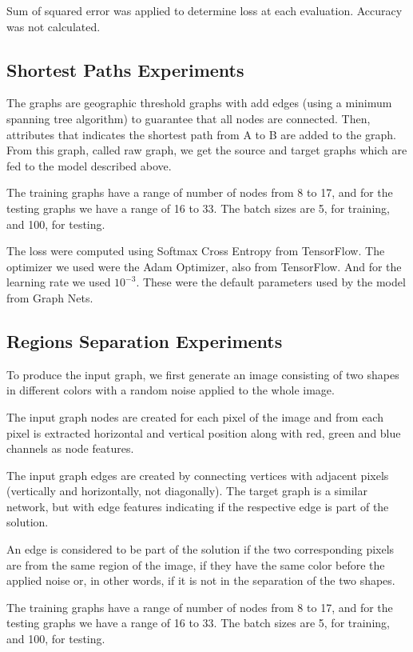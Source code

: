 Sum of squared error was applied to determine loss at each evaluation. Accuracy was not calculated.

\subsection{Shortest Paths Experiments}

The graphs are geographic threshold graphs with add edges (using a minimum spanning tree algorithm) to guarantee that all nodes are connected. Then, attributes that indicates the shortest path from A to B are added to the graph. From this graph, called raw graph, we get the source and target graphs which are fed to the model described above.

The training graphs have a range of number of nodes from 8 to 17, and for the testing graphs we have a range of 16 to 33. The batch sizes are 5, for training, and 100, for testing.

The loss were computed using Softmax Cross Entropy from TensorFlow. The optimizer we used were the Adam Optimizer, also from TensorFlow. And for the learning rate we used $10^{-3}$. These were the default parameters used by the model from Graph Nets.

\subsection{Regions Separation Experiments}

To produce the input graph, we first generate an image consisting of two shapes in different colors with a random noise applied to the whole image.

The input graph nodes are created for each pixel of the image and from each pixel is extracted horizontal and vertical position along with red, green and blue channels as node features.

The input graph edges are created by connecting vertices with adjacent pixels (vertically and horizontally, not diagonally).
The target graph is a similar network, but with edge features indicating if the respective edge is part of the solution.

An edge is considered to be part of the solution if the two corresponding pixels are from the same region of the image, if they have the same color before the applied noise or, in other words, if it is not in the separation of the two shapes.

The training graphs have a range of number of nodes from 8 to 17, and for the testing graphs we have a range of 16 to 33. The batch sizes are 5, for training, and 100, for testing.


